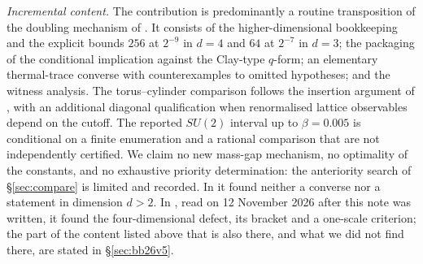 \documentclass[11pt,a4paper]{article}
\theoremstyle{plain}
\theoremstyle{definition}
\theoremstyle{remark}
\numberwithin{equation}{section}
\begin{document}
\emph{Incremental content.} The contribution is predominantly a routine transposition of the doubling mechanism of \cite{OAI26}.
It consists of the higher-dimensional bookkeeping and the explicit bounds $256$ at $2^{-9}$ in $d=4$ and $64$ at $2^{-7}$ in $d=3$; the
packaging of the conditional implication against the Clay-type $q$-form; an elementary thermal-trace converse with counterexamples to omitted
hypotheses; and the witness analysis. The torus--cylinder comparison follows the insertion argument of \cite{OAI26}, with an additional
diagonal qualification when renormalised lattice observables depend on the cutoff. The reported $SU(2)$ interval up to $\beta=0.005$ is conditional on a
finite enumeration and a rational comparison that are not independently certified. We claim no new mass-gap mechanism, no optimality of the constants, and no
exhaustive priority determination: the anteriority search of \S\ref{sec:compare} is limited and recorded. In \cite{OAI26} it found neither
a converse nor a statement in dimension $d>2$. In \cite{BB26v5}, read on 12 November 2026 after this note was written, it found the
four-dimensional defect, its bracket and a one-scale criterion; the part of the content listed above that is also there, and what we did
not find there, are stated in \S\ref{sec:bb26v5}.
\end{document}

